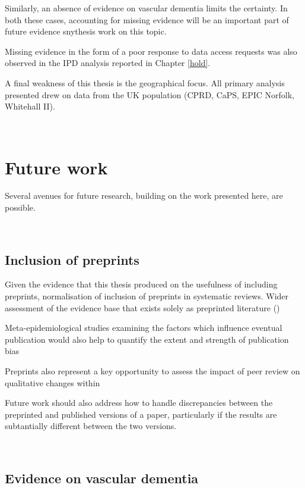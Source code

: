 \documentclass[a4paper, twoside]{templates/ociamthesis}
\begin{document}
Similarly, an absence of evidence on vascular dementia limits the certainty. In both these cases, accounting for missing evidence will be an important part of future evidence snythesis work on this topic.

Missing evidence in the form of a poor response to data access requests was also observed in the IPD analysis reported in Chapter \ref{hold}.

A final weakness of this thesis is the geographical focus. All primary analysis presented drew on data from the UK population (CPRD, CaPS, EPIC Norfolk, Whitehall II).

~

\newpage

\hypertarget{future-work-1}{%
\section{Future work}\label{future-work-1}}

Several avenues for future research, building on the work presented here, are possible.

~

\hypertarget{inclusion-of-preprints-2}{%
\subsection{Inclusion of preprints}\label{inclusion-of-preprints-2}}

Given the evidence that this thesis produced on the usefulness of including preprints, normalisation of inclusion of preprints in systematic reviews. Wider assessment of the evidence base that exists solely as preprinted literature ()

Meta-epidemiological studies examining the factors which influence eventual publication would also help to quantify the extent and strength of publication bias

Preprints also represent a key opportunity to assess the impact of peer review on qualitative changes within

Future work should also address how to handle discrepancies between the preprinted and published versions of a paper, particularly if the results are subtantially different between the two versions.

~\\
\newpage

\hypertarget{evidence-on-vascular-dementia}{%
\subsection{Evidence on vascular dementia}\label{evidence-on-vascular-dementia}}
\end{document}
